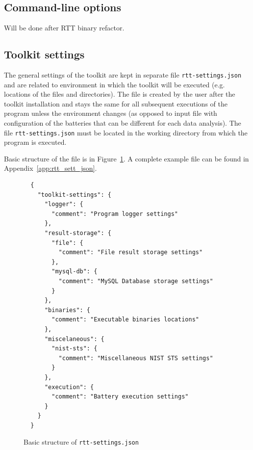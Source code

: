 \documentclass[
  digital,  	%
  color,		%
  oneside,   	%
  12pt,
  nocover,
  notable,
  nolof,
  nolot,
]{fithesis3}
\begin{document}
\subsection{Command-line options}
Will be done after RTT binary refactor.

\subsection{Toolkit settings}
The general settings of the toolkit are kept in separate file \texttt{rtt-settings.json} and are related to environment in which the toolkit will be executed (e.g. locations of the files and directories). The file is created by the user after the toolkit installation and stays the same for all subsequent executions of the program unless the environment changes (as opposed to input file with configuration of the batteries that can be different for each data analysis). The file \texttt{rtt-settings.json} must be located in the working directory from which the program is executed.

Basic structure of the file is in Figure~\ref{fig:rtt_sett_short_json}. A complete example file can be found in Appendix~\ref{app:rtt_sett_json}. 

\begin{figure}[h!]
\begin{verbatim}
  {
    "toolkit-settings": {
      "logger": {
        "comment": "Program logger settings"
      },
      "result-storage": {
        "file": {
          "comment": "File result storage settings"
        },
        "mysql-db": {
          "comment": "MySQL Database storage settings"
        }
      },
      "binaries": {
        "comment": "Executable binaries locations"
      },    
      "miscelaneous": {
        "nist-sts": {
          "comment": "Miscellaneous NIST STS settings"
        }
      },
      "execution": {
        "comment": "Battery execution settings"
      }
    }
  }
\end{verbatim}
\caption{Basic structure of \texttt{rtt-settings.json}}
\label{fig:rtt_sett_short_json}
\end{figure}
\end{document}
